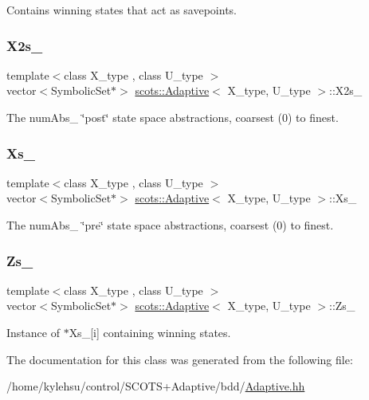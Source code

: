 Contains winning states that act as savepoints. \mbox{\label{classscots_1_1Adaptive_a532d1acf3db0235c7bbd551b41a040fc}} 
\subsubsection{\texorpdfstring{X2s\+\_\+}{X2s\_}}
{\footnotesize\ttfamily template$<$class X\+\_\+type , class U\+\_\+type $>$ \\
vector$<$Symbolic\+Set$\ast$$>$ \hyperlink{classscots_1_1Adaptive}{scots\+::\+Adaptive}$<$ X\+\_\+type, U\+\_\+type $>$\+::X2s\+\_\+}

The num\+Abs\+\_\+ \char`\"{}post\char`\"{} state space abstractions, coarsest (0) to finest. \mbox{\label{classscots_1_1Adaptive_ae43471177bc6b7d3229a9497b46ee343}} 
\subsubsection{\texorpdfstring{Xs\+\_\+}{Xs\_}}
{\footnotesize\ttfamily template$<$class X\+\_\+type , class U\+\_\+type $>$ \\
vector$<$Symbolic\+Set$\ast$$>$ \hyperlink{classscots_1_1Adaptive}{scots\+::\+Adaptive}$<$ X\+\_\+type, U\+\_\+type $>$\+::Xs\+\_\+}

The num\+Abs\+\_\+ \char`\"{}pre\char`\"{} state space abstractions, coarsest (0) to finest. \mbox{\label{classscots_1_1Adaptive_a387e00a300c8c75d3a4eb6181dfab9c4}} 
\subsubsection{\texorpdfstring{Zs\+\_\+}{Zs\_}}
{\footnotesize\ttfamily template$<$class X\+\_\+type , class U\+\_\+type $>$ \\
vector$<$Symbolic\+Set$\ast$$>$ \hyperlink{classscots_1_1Adaptive}{scots\+::\+Adaptive}$<$ X\+\_\+type, U\+\_\+type $>$\+::Zs\+\_\+}

Instance of $\ast$\+Xs\+\_\+\mbox{[}i\mbox{]} containing winning states. 

The documentation for this class was generated from the following file\+:\begin{DoxyCompactItemize}
\item 
/home/kylehsu/control/\+S\+C\+O\+T\+S+\+Adaptive/bdd/\hyperlink{Adaptive_8hh}{Adaptive.\+hh}\end{DoxyCompactItemize}
